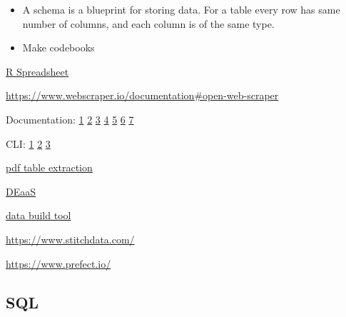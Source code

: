 \documentclass[]{book}
\begin{document}
\begin{itemize}
\item
  A schema is a blueprint for storing data. For a table every row has same number of columns, and each column is of the same type.
\item
  Make codebooks
\end{itemize}

\href{https://www.jamovi.org/}{R Spreadsheet}

\url{https://www.webscraper.io/documentation\#open-web-scraper}

Documentation: \href{http://databasenotetaker.com/}{1} \textbar{} \href{https://dataedo.com/}{2} \textbar{} \href{https://www.apexsql.com/sql-tools-doc.aspx}{3} \textbar{} \href{https://techwriter.me/best-practices-guide/documenting-databases.aspx}{4} \textbar{} \href{http://help.osf.io/m/bestpractices/l/618767-how-to-make-a-data-dictionary}{5} \textbar{} \href{https://dataedo.com/blog/different-types-of-tools-you-can-use-to-document-your-database}{6} \textbar{} \href{https://drawsql.app/\#features}{7}

CLI: \href{http://bconnelly.net/working-with-csvs-on-the-command-line/\#taking-a-peek-at-the-data-set}{1} \textbar{} \href{https://opensource.com/article/17/2/command-line-tools-data-analysis-linux?sc_cid=701600000011jJVAAY}{2} \textbar{} \href{http://alexisperrier.com/shell/2017/11/07/command-line-data-scientist.html}{3}

\href{https://tabula.technology}{pdf table extraction}

\href{https://www.astronomer.io/}{DEaaS}

\href{https://www.getdbt.com/}{data build tool}

\url{https://www.stitchdata.com/}

\url{https://www.prefect.io/}

\hypertarget{sql}{%
\subsection{SQL}\label{sql}}
\end{document}
